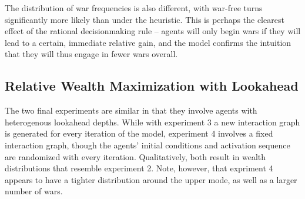\documentclass{article}
\begin{document}
The distribution of war frequencies is also different, with war-free turns significantly more likely than under the heuristic. This is perhaps the clearest effect of the rational decisionmaking rule -- agents will only begin wars if they will lead to a certain, immediate relative gain, and the model confirms the intuition that they will thus engage in fewer wars overall. 

\subsection{Relative Wealth Maximization with Lookahead}

The two final experiments are similar in that they involve agents with heterogenous lookahead depths. While with experiment 3 a new interaction graph is generated for every iteration of the model, experiment 4 involves a fixed interaction graph, though the agents' initial conditions and activation sequence are randomized with every iteration. Qualitatively, both result in wealth distributions that resemble experiment 2. Note, however, that expriment 4 appears to have a tighter distribution around the upper mode, as well as a larger number of wars.
\end{document}
